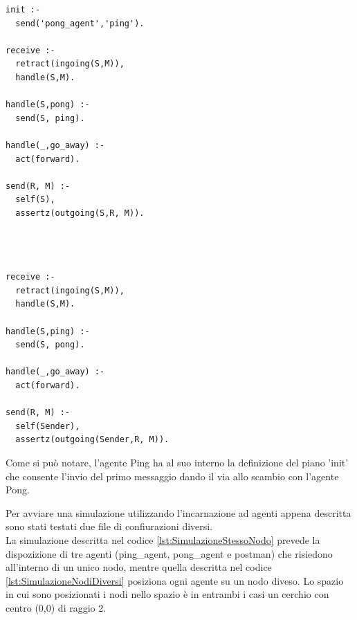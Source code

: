 \documentclass[12pt,a4paper,openright,twoside]{report}
\begin{document}
\bigskip
\medskip
\begin{minipage}{0.45\textwidth}
\begin{lstlisting}[label={lst:PingAgent},caption={Ping agent}]
init :-
  send('pong_agent','ping').

receive :-
  retract(ingoing(S,M)),
  handle(S,M).

handle(S,pong) :-
  send(S, ping).

handle(_,go_away) :-
  act(forward).

send(R, M) :-
  self(S),
  assertz(outgoing(S,R, M)).
\end{lstlisting}
\end{minipage}
\hfill
\begin{minipage}{0.45\textwidth}
\begin{lstlisting}[label={lst:PongAgent},caption={Pong agent}]



receive :-
  retract(ingoing(S,M)),
  handle(S,M).

handle(S,ping) :-
  send(S, pong).

handle(_,go_away) :-
  act(forward).

send(R, M) :-
  self(Sender),
  assertz(outgoing(Sender,R, M)).
\end{lstlisting}
\end{minipage}%

\bigskip

Come si pu\`o notare, l'agente Ping ha al suo interno la definizione del piano 'init' che consente l'invio del primo messaggio dando il via allo scambio con l'agente Pong.

Per avviare una simulazione utilizzando l'incarnazione ad agenti appena descritta sono stati testati due file di confiurazioni diversi.
\\
La simulazione descritta nel codice \ref{lst:SimulazioneStessoNodo} prevede la dispozizione di tre agenti (ping\_agent, pong\_agent e postman) che risiedono all'interno di un unico nodo, mentre quella descritta nel codice \ref{lst:SimulazioneNodiDiversi} posiziona ogni agente su un nodo diveso. Lo spazio in cui sono posizionati i nodi nello spazio \`e in entrambi i casi un cerchio con centro (0,0) di raggio 2.
\end{document}

